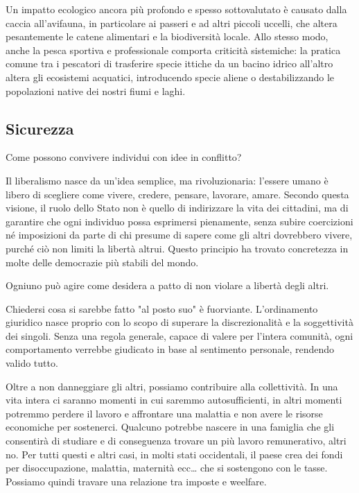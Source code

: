 \documentclass[12pt]{book} %
\begin{document}
\begin{mdframed}[linewidth=1pt]
Un impatto ecologico ancora più profondo e spesso sottovalutato è causato dalla caccia all'avifauna, in particolare ai passeri e ad altri piccoli uccelli, che altera pesantemente le catene alimentari e la biodiversità locale. Allo stesso modo, anche la pesca sportiva e professionale comporta criticità sistemiche: la pratica comune tra i pescatori di trasferire specie ittiche da un bacino idrico all'altro altera gli ecosistemi acquatici, introducendo specie aliene o destabilizzando le popolazioni native dei nostri fiumi e laghi.
\end{mdframed}

\subsection{Sicurezza}
Come possono convivere individui con idee in conflitto?

Il liberalismo nasce da un’idea semplice, ma rivoluzionaria: l’essere umano è libero di scegliere come vivere, credere, pensare, lavorare, amare. Secondo questa visione, il ruolo dello Stato non è quello di indirizzare la vita dei cittadini, ma di garantire che ogni individuo possa esprimersi pienamente, senza subire coercizioni né imposizioni da parte di chi presume di sapere come gli altri dovrebbero vivere, purché ciò non limiti la libertà altrui. Questo principio ha trovato concretezza in molte delle democrazie più stabili del mondo.

Ogniuno può agire come desidera a patto di non violare a libertà degli altri.

Chiedersi cosa si sarebbe fatto "al posto suo" è fuorviante. L'ordinamento giuridico nasce proprio con lo scopo di superare la discrezionalità e la soggettività dei singoli. Senza una regola generale, capace di valere per l'intera comunità, ogni comportamento verrebbe giudicato in base al sentimento personale, rendendo valido tutto.

Oltre a non danneggiare gli altri, possiamo contribuire alla collettività. In una vita intera ci saranno momenti in cui saremmo autosufficienti, in altri momenti potremmo perdere il lavoro e affrontare una malattia e non avere le risorse economiche per sostenerci. Qualcuno potrebbe nascere in una famiglia che gli consentirà di studiare e di conseguenza trovare un più lavoro remunerativo, altri no. Per tutti questi e altri casi, in molti stati occidentali, il paese crea dei fondi per disoccupazione, malattia, maternità ecc… che si sostengono con le tasse. Possiamo quindi travare una relazione tra imposte e weelfare. 
\end{document}
